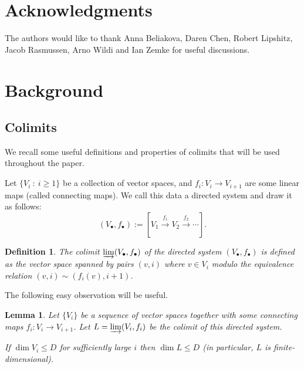\documentclass{amsart}
\newtheorem{lemma}[theorem]{Lemma}
\newtheorem{definition}[theorem]{Definition}
\renewcommand{\AA}[1]{{\color{blue}#1}}
\begin{document}
\section*{Acknowledgments}

The authors would like to thank Anna Beliakova, Daren Chen, Robert Lipshitz, Jacob Rasmussen, Arno Wildi and Ian Zemke for useful discussions. 


\section{Background}

\subsection{Colimits}

We recall some useful definitions and properties of colimits that will be used throughout the paper. 

Let $\{V_i\ :\ i\ge 1\}$ be a collection of vector spaces, and $f_i:V_i\to V_{i+1}$ are some linear maps (called connecting maps). We call this data a directed system and draw it as follows: 
\begin{equation}
\label{eq: directed system}
(V_{\bullet},f_{\bullet}):=\left[V_1\xrightarrow{f_1} V_2\xrightarrow{f_2} \cdots \right].
\end{equation}
\begin{definition}
The colimit $\varinjlim(V_{\bullet},f_{\bullet})$ of the directed system $(V_{\bullet},f_{\bullet})$ is defined as the vector space spanned by pairs $(v,i)$ where $v\in V_i$ modulo the equivalence relation $(v,i)\sim (f_i(v),i+1)$.
\end{definition}

The following easy observation will be useful.

\begin{lemma}
\label{lem: colimit bounded}
Let $\{V_i\}$ be a sequence of vector spaces together with some connecting maps $f_i:V_i\to V_{i+1}$. Let $L=\varinjlim(V_i,f_i)$ be the colimit of this directed system.

If $\dim V_i\le D$ for sufficiently large $i$ then $\dim L\le D$ (in particular, $L$ is finite-dimensional).
\end{lemma}
\end{document}
